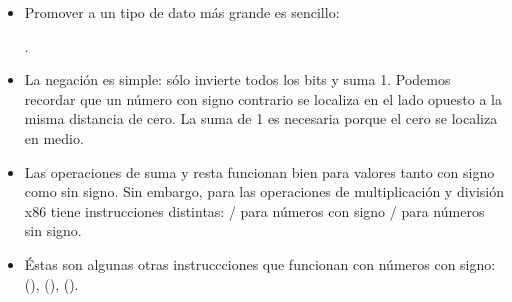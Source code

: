 \begin{itemize}
\item Promover a un tipo de dato m\'as grande es sencillo:

.

\label{sec:signednumbers:negation}
\item La negaci\'on es simple: s\'olo invierte todos los bits y suma 1.
Podemos recordar que un n\'umero con signo contrario se localiza en el lado opuesto a la misma distancia de cero.
La suma de 1 es necesaria porque el cero se localiza en medio.

\item Las operaciones de suma y resta funcionan bien para valores tanto con signo como sin signo.
	Sin embargo, para las operaciones de multiplicaci\'on y divisi\'on x86 tiene instrucciones distintas:
	/ para n\'umeros con signo \ESph{} / para n\'umeros sin signo.
\item \'Estas son algunas otras instruccciones que funcionan con n\'umeros con signo:
	 (),  (),  ().
\end{itemize}


